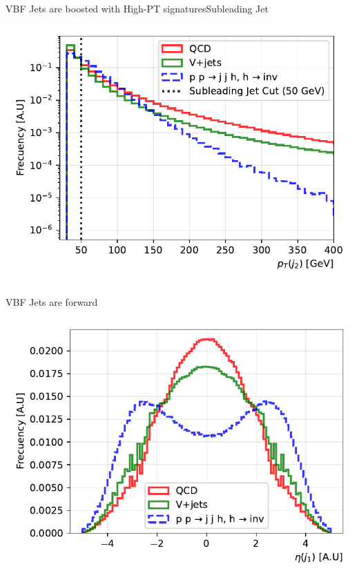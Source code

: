 \documentclass{../../bredelebeamer}
\begin{document}
\begin{frame}{VBF Jets are boosted with High-PT signatures}{Subleading Jet}
    \begin{minipage}{0.97\textwidth}
        \includegraphics[width=\textwidth]{../Images/subleading_jet_pt_comparison.pdf}
    \end{minipage}
\end{frame}
\begin{frame}{VBF Jets are forward}
    \begin{minipage}{0.97\textwidth}
        \includegraphics[width=\textwidth]{../Images/leading_jet_eta_comparison.pdf}
    \end{minipage}
\end{frame}
\end{document}
